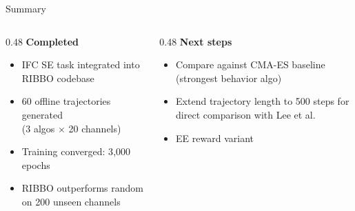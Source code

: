 \documentclass[10pt,aspectratio=169]{beamer}
\newenvironment{tightitemize}{%
    \begin{itemize}
        \setlength{\itemsep}{1pt}
        \setlength{\parskip}{0pt}
        \setlength{\parsep}{0pt}
}{%
    \end{itemize}
}
\begin{document}
\begin{frame}{Summary}
    \small
    \begin{columns}[T,onlytextwidth]
        \begin{column}{0.48\textwidth}
            \textbf{Completed}
            \begin{tightitemize}
                \item[\checkmark] IFC SE task integrated into RIBBO codebase
                \item[\checkmark] 60 offline trajectories generated \\(3 algos $\times$ 20 channels)
                \item[\checkmark] Training converged: 3{,}000 epochs
                \item[\checkmark] RIBBO outperforms random on 200 unseen channels
            \end{tightitemize}
        \end{column}
        \begin{column}{0.48\textwidth}
            \textbf{Next steps}
            \begin{tightitemize}
                \item Compare against CMA-ES baseline (strongest behavior algo)
                \item Extend trajectory length to 500 steps for direct comparison with Lee et al.
                \item EE reward variant
            \end{tightitemize}
        \end{column}
    \end{columns}
\end{frame}
\end{document}
